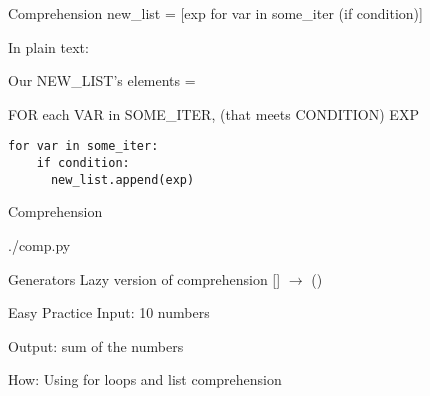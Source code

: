 \documentclass{beamer}
\begin{document}
\begin{frame}[fragile]{Comprehension}
  new\_list = [exp for var in some\_iter (if condition)]

  In plain text:

  Our NEW\_LIST's elements =

  FOR each VAR in SOME\_ITER, (that meets CONDITION)
  EXP

  \begin{lstlisting}
for var in some_iter:
    if condition:
      new_list.append(exp)
  \end{lstlisting}
\end{frame}

\begin{frame}[fragile]{Comprehension}
  \begin{lstinputlisting}
    {./comp.py}
  \end{lstinputlisting}
\end{frame}

\begin{frame}[fragile]{Generators}
  Lazy version of comprehension [] $\rightarrow$ ()
\end{frame}

\begin{frame}{Easy Practice}
  Input: 10 numbers

  Output: sum of the numbers

  How: Using for loops and list comprehension
\end{frame}
\end{document}
